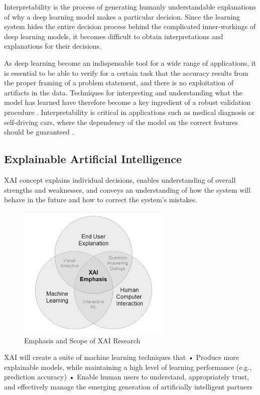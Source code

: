 Interpretability is the process of generating humanly understandable explanations of why a deep learning model makes a particular decision. Since the learning system hides the entire decision process behind the complicated inner-workings of deep learning models, it becomes difficult to obtain interpretations and explanations for their decisions.

As deep learning become an indispensable tool for a wide range of applications, it is essential to be able to verify for a certain task that the accuracy results from the proper framing of a problem statement, and there is no exploitation of artifacts in the data. Techniques for interpreting and understanding what the model has learned have therefore become a key ingredient of a robust validation procedure \citep{taylor2006methods} \citep{hansen2011visual} \citep{bach2015pixel}. Interpretability is critical in applications such as medical diagnosis or self-driving cars, where the dependency of the model on the correct features should be guaranteed \citep{Caruana:2015:IMH:2783258.2788613} \citep{bojarski2017explaining}.

\subsection{Explainable Artificial Intelligence}
XAI concept explains individual decisions, enables understanding of overall strengths and weaknesses, and conveys an understanding of how the system will behave in the future and how to correct the system’s mistakes.

\begin{figure}[htbp]
\centering
\includegraphics[width=0.65\textwidth]{images/XAI Research-1-crop.png}
\caption{Emphasis and Scope of XAI Research}
\label{fig:xai-1}
\end{figure}
XAI will create a suite of machine learning techniques that • Produce more explainable models, while maintaining a high level of learning performance (e.g., prediction accuracy)
• Enable human users to understand, appropriately trust, and effectively manage the emerging generation of artificially intelligent partners

